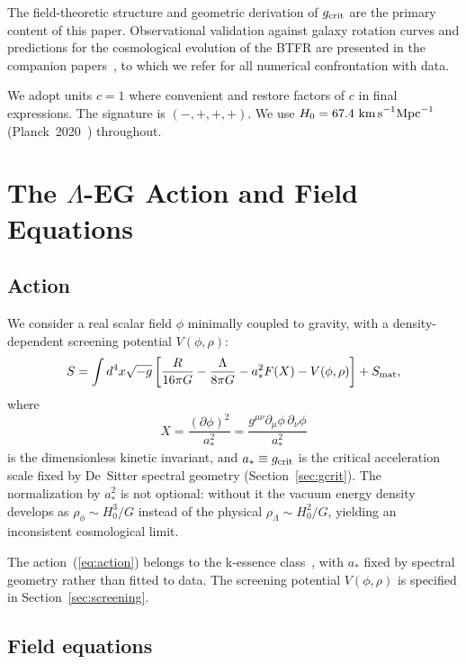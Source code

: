 \documentclass[11pt,a4paper]{article}
\begin{document}
The field-theoretic structure and geometric derivation of $g_{\rm crit}$ are the primary
content of this paper. Observational validation against galaxy rotation curves and
predictions for the cosmological evolution of the BTFR are presented in the companion
papers~\cite{PaperI,PaperII}, to which we refer for all numerical confrontation with data.

We adopt units $c = 1$ where convenient and restore factors of $c$ in final expressions.
The signature is $(-,+,+,+)$. We use $H_0 = 67.4\ \text{km\,s}^{-1}\text{Mpc}^{-1}$
(Planck~2020~\cite{Planck2020}) throughout.

\section{The \texorpdfstring{$\Lambda$}{Lambda}-EG Action and Field Equations}
\label{sec:action}

\subsection{Action}
\label{subsec:action}

We consider a real scalar field $\phi$ minimally coupled to gravity, with a
density-dependent screening potential $V(\phi,\rho)$:
\begin{equation}
  S = \int d^4x\sqrt{-g}\left[\frac{R}{16\pi G} - \frac{\Lambda}{8\pi G}
  - a_*^2 F(X) - V(\phi,\rho)\right] + S_{\rm mat},
  \label{eq:action}
\end{equation}
where
\begin{equation}
  X = \frac{(\partial\phi)^2}{a_*^2} = \frac{g^{\mu\nu}\partial_\mu\phi\,\partial_\nu\phi}{a_*^2}
\end{equation}
is the dimensionless kinetic invariant, and $a_* \equiv g_{\rm crit}$ is the critical
acceleration scale fixed by De~Sitter spectral geometry (Section~\ref{sec:gcrit}).
The normalization by $a_*^2$ is not optional: without it the vacuum energy density
develops as $\rho_\phi\sim H_0^3/G$ instead of the physical $\rho_\Lambda\sim H_0^2/G$,
yielding an inconsistent cosmological limit.

The action~(\ref{eq:action}) belongs to the k-essence class~\cite{ArmendarizPicon1999},
with $a_*$ fixed by spectral geometry rather than fitted to data. The screening potential
$V(\phi,\rho)$ is specified in Section~\ref{sec:screening}.

\subsection{Field equations}
\label{subsec:fieldeqs}
\end{document}
